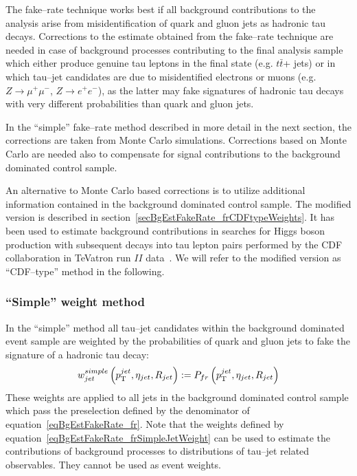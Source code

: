 The fake--rate technique works best if all background contributions to the
analysis arise from misidentification of quark and gluon jets as hadronic tau
decays.  Corrections to the estimate obtained from the fake--rate technique  are
needed in case of background processes contributing to the final analysis sample
which either produce genuine tau leptons in the final state (e.g. $t\bar{t}$+
jets) or in which tau--jet candidates are due to misidentified electrons or
muons (e.g. $Z \rightarrow \mu^{+} \mu^{-}$, $Z \rightarrow e^{+} e^{-}$), as
the latter may fake signatures of hadronic tau decays with very different
probabilities than quark and gluon jets.

In the ``simple'' fake--rate method described in more detail in the next
section, the corrections are taken from Monte Carlo simulations.  Corrections
based on Monte Carlo are needed also to compensate for signal contributions to
the background dominated control sample.

An alternative to Monte Carlo based corrections is to utilize additional
information contained in the background dominated control sample.  The modified
version is described in section~\ref{secBgEstFakeRate_frCDFtypeWeights}.  It has
been used to estimate background contributions in searches for Higgs boson
production with subsequent decays into tau lepton pairs performed by the CDF
collaboration in TeVatron run $II$ data~\cite{CDFtypeFakeRateMethod}.  We will
refer to the modified version as ``CDF--type'' method in the following.

\subsubsection{``Simple'' weight method}

In the ``simple'' method all tau--jet candidates within the background dominated
event sample are weighted by the probabilities of quark and gluon jets to fake
the signature of a hadronic tau decay:
\begin{equation}
w_{jet}^{simple} \left( p_{\mathrm{T}}^{jet}, \eta_{jet}, R_{jet} \right) := P_{fr} \left( p_{\mathrm{T}}^{jet}, \eta_{jet}, R_{jet} \right)
\label{eqBgEstFakeRate_frSimpleJetWeight}
\end{equation}
These weights are applied to all jets in the background dominated control sample
which pass the preselection defined by the denominator of
equation~\ref{eqBgEstFakeRate_fr}.  Note that the weights defined by
equation~\ref{eqBgEstFakeRate_frSimpleJetWeight} can be used to estimate the
contributions of background processes to distributions of tau--jet related
observables.  They cannot be used as event weights.

